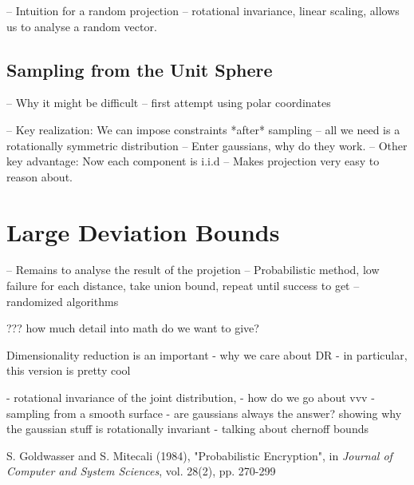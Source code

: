 \documentclass[11pt]{article}
\newcommand{\ir}[1]{\textnormal{\sc#1}}
\begin{document}
-- Intuition for a random projection
-- rotational invariance, linear scaling, allows us to analyse a random vector.

\subsection{Sampling from the Unit Sphere}
-- Why it might be difficult
-- first attempt using polar coordinates

-- Key realization: We can impose constraints *after* sampling
   -- all we need is a rotationally symmetric distribution
-- Enter gaussians, why do they work.
-- Other key advantage: Now each component is i.i.d
    -- Makes projection very easy to reason about.

\section{Large Deviation Bounds}
-- Remains to analyse the result of the projetion
-- Probabilistic method, low failure for each distance, take union bound, repeat until success to get
-- randomized algorithms

??? how much detail into math do we want to give?



Dimensionality reduction is an important 
- why we care about DR
- in particular, this version is pretty cool

- rotational invariance of the joint distribution, 
- how do we go about vvv 
- sampling from a smooth surface
- are gaussians always the answer?
showing why the gaussian stuff is rotationally invariant
- talking about chernoff bounds

\begin{thebibliography}{1}
     \ir{S. Goldwasser and S. Mitecali} (1984), "Probabilistic Encryption", in \textit{Journal of Computer and System Sciences}, vol. 28(2), pp. 270-299
        
\end{thebibliography}
\end{document}
